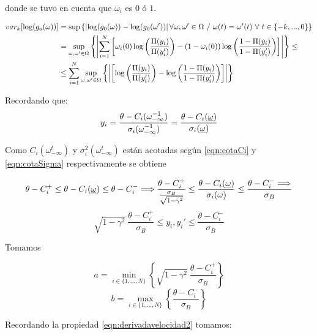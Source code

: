 donde se tuvo en cuenta que $\omega_i$ es $0$ ó $1$.

\begin{align}
\nonumber    var_k[\log(g_o(\omega))] &= \sup \left\{  \left|\log(g_0(\omega)) - \log(g_0(\omega'))\right|  \forall \omega,\omega' \in \Omega \ / \  \omega(t) = \omega'(t) \ \forall \ t \in \{-k,...,0\} \right\}\\
\nonumber    &=\sup_{\omega,\omega' \in \Omega} \left\{  \left|\sum_{i=1}^N \left[ \omega_i(0) \log\left(\frac{\Pi(y_i)}{\Pi(y_i')}\right) - (1-\omega_i(0)) \log \left(\frac{1-\Pi(y_i)}{1-\Pi(y_i')} \right) \right]\right| \right\} \leq \\
    & \leq \sum_{i=1}^N \sup_{\omega,\omega' \in \Omega} \left\{  \left| \left[ \log\left(\frac{\Pi(y_i)}{\Pi(y_i')}\right) - \log\left(\frac{1-\Pi(y_i)}{1-\Pi(y_i')}\right) \right]\right| \right\}
    \label{eqn:varlog1}
\end{align}

Recordando que:
\begin{align*}
    y_i= \frac{\theta - C_i(\omega_{-\infty}^{-1})} {\sigma_i(\omega_{-\infty}^{-1})} = 
         \frac{\theta - C_i(\underline{\omega})} {\sigma_i(\underline{\omega})}
\end{align*}

Como $C_i(\omega_{-\infty}^t)$ y $\sigma_i^2(\omega_{-\infty}^t)$ están acotadas según \eqref{eqn:cotaCi} y \eqref{eqn:cotaSigma} respectivamente se obtiene

\begin{equation}
    \theta - C_i^+ \leq \theta - C_i(\underline{\omega}) \leq \theta - C_i^- \Longrightarrow
    \frac{\theta - C_i^+}{\frac{\sigma_B}{\sqrt{1-\gamma^2}}} \leq \frac{\theta - C_i(\underline{\omega})}{\sigma_i(\omega)} \leq \frac{\theta - C_i^- \Longrightarrow }{\sigma_B}    
\end{equation}
\begin{equation}
    \sqrt{1-\gamma^2}~\frac{\theta - C_i^+}{\sigma_B} \leq y_i, y_i' \leq \frac{\theta - C_i^- }{\sigma_B}
\end{equation}

Tomamos 

\begin{equation*}
    a= \min_{i\in\{1,...,N\}} \left\{\sqrt{1-\gamma^2}~\frac{\theta - C_i^+}{\sigma_B} \right\}
\end{equation*}
\begin{equation*}
    b= \max_{i\in\{1,...,N\}} \left\{\frac{\theta - C_i^-}{\sigma_B} \right\}
\end{equation*}

Recordando la propiedad \eqref{eqn:derivadavelocidad2} tomamos:

